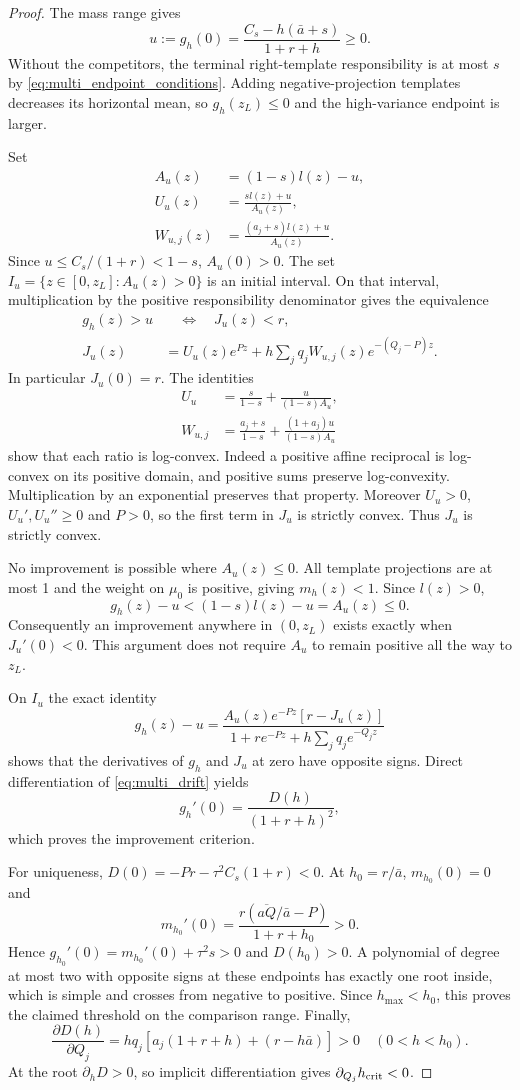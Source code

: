 \begin{proof}
The mass range gives
\[
 u:=g_h(0)=\frac{C_s-h(\bar a+s)}{1+r+h}\ge0.
\]
Without the competitors, the terminal right-template responsibility
is at most $s$ by \eqref{eq:multi_endpoint_conditions}.
Adding negative-projection templates decreases its horizontal mean,
so $g_h(z_L)\le0$ and the high-variance endpoint is larger.

Set
\begin{align*}
 A_u(z)&=(1-s)l(z)-u,\\
 U_u(z)&=\frac{s l(z)+u}{A_u(z)},\\
 W_{u,j}(z)&=\frac{(a_j+s)l(z)+u}{A_u(z)}.
\end{align*}
Since $u\le C_s/(1+r)<1-s$, $A_u(0)>0$.
The set $I_u=\{z\in[0,z_L]:A_u(z)>0\}$ is an initial interval.
On that interval, multiplication by the positive responsibility
denominator gives the equivalence
\begin{align}
 g_h(z)>u
 &\quad\Longleftrightarrow\quad J_u(z)<r,\nonumber\\
 J_u(z)&=U_u(z)e^{Pz}
     +h\sum_jq_jW_{u,j}(z)e^{-(Q_j-P)z}.
 \label{eq:multi_convex_test}
\end{align}
In particular $J_u(0)=r$.
The identities
\begin{align*}
 U_u&=\frac{s}{1-s}+\frac{u}{(1-s)A_u},\\
 W_{u,j}&=\frac{a_j+s}{1-s}
             +\frac{(1+a_j)u}{(1-s)A_u}
\end{align*}
show that each ratio is log-convex.
Indeed a positive affine reciprocal is log-convex on its positive
domain, and positive sums preserve log-convexity.
Multiplication by an exponential preserves that property.
Moreover $U_u>0$, $U_u',U_u''\ge0$ and $P>0$, so the first
term in $J_u$ is strictly convex. Thus $J_u$ is strictly convex.

No improvement is possible where $A_u(z)\le0$.
All template projections are at most 1 and the weight on $\mu_0$
is positive, giving $m_h(z)<1$. Since $l(z)>0$,
\[
 g_h(z)-u<(1-s)l(z)-u=A_u(z)\le0.
\]
Consequently an improvement anywhere in $(0,z_L)$ exists exactly
when $J_u'(0)<0$. This argument does not require $A_u$ to remain
positive all the way to $z_L$.

On $I_u$ the exact identity
\[
 g_h(z)-u=
 \frac{A_u(z)e^{-Pz}[r-J_u(z)]}
      {1+r e^{-Pz}+h\sum_jq_je^{-Q_jz}}
\]
shows that the derivatives of $g_h$ and $J_u$ at zero have
opposite signs. Direct differentiation of
\eqref{eq:multi_drift} yields
\[
 g_h'(0)=\frac{D(h)}{(1+r+h)^2},
\]
which proves the improvement criterion.

For uniqueness,
$D(0)=-Pr-\tau^2C_s(1+r)<0$.
At $h_0=r/\bar a$, $m_{h_0}(0)=0$ and
\[
 m_{h_0}'(0)=
 \frac{r(\overline{aQ}/\bar a-P)}{1+r+h_0}>0.
\]
Hence $g_{h_0}'(0)=m_{h_0}'(0)+\tau^2s>0$ and $D(h_0)>0$.
A polynomial of degree at most two with opposite signs at these
endpoints has exactly one root inside, which is simple and crosses
from negative to positive. Since $h_{\max}<h_0$, this proves the
claimed threshold on the comparison range.
Finally,
\[
 \frac{\partial D(h)}{\partial Q_j}
 =h q_j[a_j(1+r+h)+(r-h\bar a)]>0
 \quad(0<h<h_0).
\]
At the root $\partial_hD>0$, so implicit differentiation gives
$\partial_{Q_j}h_{\rm crit}<0$.
\end{proof}

